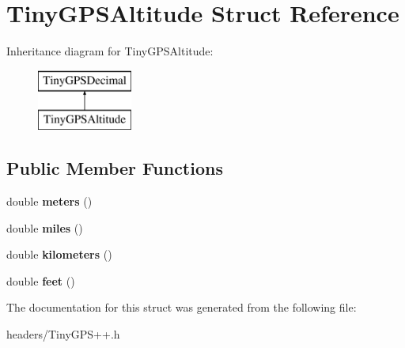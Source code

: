 \hypertarget{struct_tiny_g_p_s_altitude}{}\section{Tiny\+G\+P\+S\+Altitude Struct Reference}
\label{struct_tiny_g_p_s_altitude}
Inheritance diagram for Tiny\+G\+P\+S\+Altitude\+:\begin{figure}[H]
\begin{center}
\leavevmode
\includegraphics[height=2.000000cm]{struct_tiny_g_p_s_altitude}
\end{center}
\end{figure}
\subsection*{Public Member Functions}
\begin{DoxyCompactItemize}
\item 
double {\bfseries meters} ()\hypertarget{struct_tiny_g_p_s_altitude_a5a39d145bb1778814007206c765189f7}{}\label{struct_tiny_g_p_s_altitude_a5a39d145bb1778814007206c765189f7}

\item 
double {\bfseries miles} ()\hypertarget{struct_tiny_g_p_s_altitude_a5ae68d990ea08d4e21cfa6aefb46cc03}{}\label{struct_tiny_g_p_s_altitude_a5ae68d990ea08d4e21cfa6aefb46cc03}

\item 
double {\bfseries kilometers} ()\hypertarget{struct_tiny_g_p_s_altitude_a1eb3e5b425784fc0db3e9ffe0f77f741}{}\label{struct_tiny_g_p_s_altitude_a1eb3e5b425784fc0db3e9ffe0f77f741}

\item 
double {\bfseries feet} ()\hypertarget{struct_tiny_g_p_s_altitude_ac782babc0c485d47e6f57384e88b8cc8}{}\label{struct_tiny_g_p_s_altitude_ac782babc0c485d47e6f57384e88b8cc8}

\end{DoxyCompactItemize}


The documentation for this struct was generated from the following file\+:\begin{DoxyCompactItemize}
\item 
headers/Tiny\+G\+P\+S++.\+h\end{DoxyCompactItemize}
